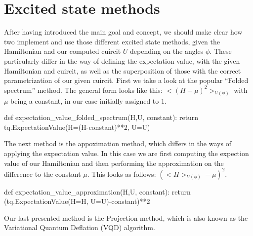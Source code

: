 \documentclass[
  letterpaper,
  DIV=11,
  numbers=noendperiod]{scrartcl}
\newenvironment{Shaded}{\begin{snugshade}}{\end{snugshade}}
\newcommand{\ControlFlowTok}[1]{\textcolor[rgb]{0.00,0.23,0.31}{#1}}
\newcommand{\DecValTok}[1]{\textcolor[rgb]{0.68,0.00,0.00}{#1}}
\newcommand{\KeywordTok}[1]{\textcolor[rgb]{0.00,0.23,0.31}{#1}}
\newcommand{\NormalTok}[1]{\textcolor[rgb]{0.00,0.23,0.31}{#1}}
\newcommand{\OperatorTok}[1]{\textcolor[rgb]{0.37,0.37,0.37}{#1}}
\begin{document}
\section{Excited state methods}\label{excited-state-methods}

After having introduced the main goal and concept, we should make clear
how two implement and use those different excited state methods, given
the Hamiltonian and our computed cuircit \(U\) depending on the angles
\(\phi\). These particularly differ in the way of defining the
expectation value, with the given Hamiltonian and cuircit, as well as
the superposition of those with the correct parametrization of our given
cuircit. First we take a look at the popular ``Folded spectrum'' method.
The general form looks like this: \(<(H-\mu)^2>_{U(\phi)}\) with \(\mu\)
being a constant, in our case initially assigned to 1.\\

\begin{Shaded}
\begin{Highlighting}[]
\KeywordTok{def}\NormalTok{ expectation\_value\_folded\_spectrum(H,U, constant):}
    \ControlFlowTok{return}\NormalTok{ tq.ExpectationValue(H}\OperatorTok{=}\NormalTok{(H}\OperatorTok{{-}}\NormalTok{constant)}\OperatorTok{**}\DecValTok{2}\NormalTok{, U}\OperatorTok{=}\NormalTok{U)}
\end{Highlighting}
\end{Shaded}

The next method is the appoximation method, which differs in the ways of
applying the expectation value. In this case we are first computing the
expection value of our Hamiltonian and then performing the approximation
on the difference to the constant \(\mu\). This looks as follows:
\((<H>_{U(\phi)}-\mu)^2\).\\

\begin{Shaded}
\begin{Highlighting}[]
\KeywordTok{def}\NormalTok{ expectation\_value\_approximation(H,U, constant):}
    \ControlFlowTok{return}\NormalTok{ (tq.ExpectationValue(H}\OperatorTok{=}\NormalTok{H, U}\OperatorTok{=}\NormalTok{U)}\OperatorTok{{-}}\NormalTok{constant)}\OperatorTok{**}\DecValTok{2}
\end{Highlighting}
\end{Shaded}

\hfill\break
Our last presented method is the Projection method, which is also known
as the Variational Quantum Deflation (VQD) algorithm.
\end{document}
